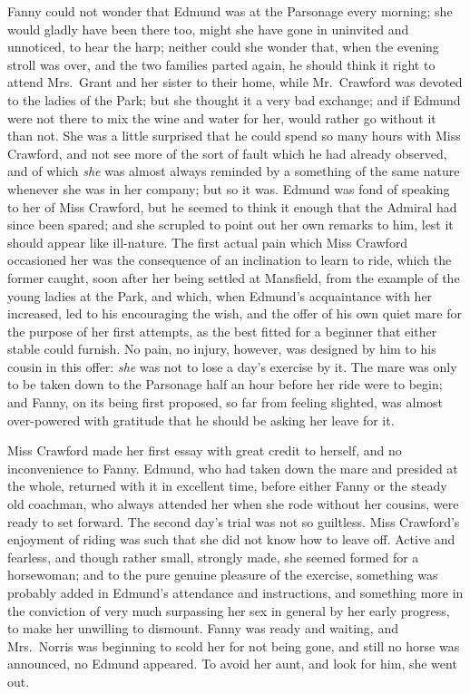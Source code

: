 Fanny could not wonder that Edmund was at the Parsonage
every morning; she would gladly have been there too,
might she have gone in uninvited and unnoticed, to hear
the harp; neither could she wonder that, when the evening
stroll was over, and the two families parted again,
he should think it right to attend Mrs.\ Grant and her
sister to their home, while Mr.\ Crawford was devoted
to the ladies of the Park; but she thought it a very
bad exchange; and if Edmund were not there to mix the wine
and water for her, would rather go without it than not.
She was a little surprised that he could spend so many
hours with Miss Crawford, and not see more of the sort
of fault which he had already observed, and of which \emph{she}
was almost always reminded by a something of the same
nature whenever she was in her company; but so it was.
Edmund was fond of speaking to her of Miss Crawford,
but he seemed to think it enough that the Admiral had
since been spared; and she scrupled to point out her own
remarks to him, lest it should appear like ill-nature.
The first actual pain which Miss Crawford occasioned her
was the consequence of an inclination to learn to ride,
which the former caught, soon after her being settled
at Mansfield, from the example of the young ladies at the Park,
and which, when Edmund's acquaintance with her increased,
led to his encouraging the wish, and the offer of his own
quiet mare for the purpose of her first attempts, as the best
fitted for a beginner that either stable could furnish.
No pain, no injury, however, was designed by him to his
cousin in this offer:  \emph{she} was not to lose a day's exercise
by it.  The mare was only to be taken down to the Parsonage
half an hour before her ride were to begin; and Fanny,
on its being first proposed, so far from feeling slighted,
was almost over-powered with gratitude that he should be
asking her leave for it.

Miss Crawford made her first essay with great credit
to herself, and no inconvenience to Fanny.  Edmund,
who had taken down the mare and presided at the whole,
returned with it in excellent time, before either Fanny
or the steady old coachman, who always attended her when
she rode without her cousins, were ready to set forward.
The second day's trial was not so guiltless.  Miss Crawford's
enjoyment of riding was such that she did not know how to
leave off.  Active and fearless, and though rather small,
strongly made, she seemed formed for a horsewoman; and to
the pure genuine pleasure of the exercise, something was
probably added in Edmund's attendance and instructions,
and something more in the conviction of very much surpassing
her sex in general by her early progress, to make her
unwilling to dismount.  Fanny was ready and waiting,
and Mrs.\ Norris was beginning to scold her for not being gone,
and still no horse was announced, no Edmund appeared.
To avoid her aunt, and look for him, she went out.

